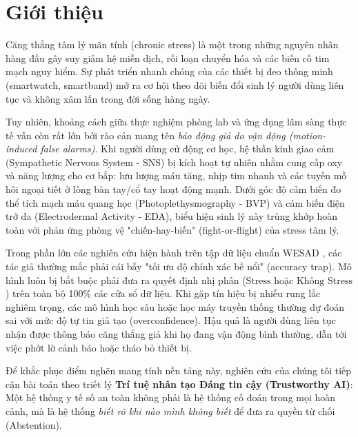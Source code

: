 \documentclass[conference]{IEEEtran}
\begin{document}
\section{Giới thiệu}
Căng thẳng tâm lý mãn tính (chronic stress) là một trong những nguyên nhân hàng đầu gây suy giảm hệ miễn dịch, rối loạn chuyển hóa và các biến cố tim mạch nguy hiểm. Sự phát triển nhanh chóng của các thiết bị đeo thông minh (smartwatch, smartband) mở ra cơ hội theo dõi biến đổi sinh lý người dùng liên tục và không xâm lấn trong đời sống hàng ngày.

Tuy nhiên, khoảng cách giữa thực nghiệm phòng lab và ứng dụng lâm sàng thực tế vẫn còn rất lớn bởi rào cản mang tên \textit{báo động giả do vận động (motion-induced false alarms)}. Khi người dùng cử động cơ học, hệ thần kinh giao cảm (Sympathetic Nervous System - SNS) bị kích hoạt tự nhiên nhằm cung cấp oxy và năng lượng cho cơ bắp: lưu lượng máu tăng, nhịp tim nhanh và các tuyến mồ hôi ngoại tiết ở lòng bàn tay/cổ tay hoạt động mạnh. Dưới góc độ cảm biến đo thể tích mạch máu quang học (Photoplethysmography - BVP) và cảm biến điện trở da (Electrodermal Activity - EDA), biểu hiện sinh lý này trùng khớp hoàn toàn với phản ứng phòng vệ "chiến-hay-biến" (fight-or-flight) của stress tâm lý. 

Trong phần lớn các nghiên cứu hiện hành trên tập dữ liệu chuẩn WESAD \cite{schmidt2018wesad, bobade2020stress}, các tác giả thường mắc phải cái bẫy "tối ưu độ chính xác bề nổi" (accuracy trap). Mô hình luôn bị bắt buộc phải đưa ra quyết định nhị phân ($\text{Stress}$ hoặc $\text{Không Stress}$) trên toàn bộ 100\% các cửa sổ dữ liệu. Khi gặp tín hiệu bị nhiễu rung lắc nghiêm trọng, các mô hình học sâu hoặc học máy truyền thống thường dự đoán sai với mức độ tự tin giả tạo (overconfidence). Hậu quả là người dùng liên tục nhận được thông báo căng thẳng giả khi họ đang vận động bình thường, dẫn tới việc phớt lờ cảnh báo hoặc tháo bỏ thiết bị.

Để khắc phục điểm nghẽn mang tính nền tảng này, nghiên cứu của chúng tôi tiếp cận bài toán theo triết lý \textbf{Trí tuệ nhân tạo Đáng tin cậy (Trustworthy AI)}: Một hệ thống y tế số an toàn không phải là hệ thống cố đoán trong mọi hoàn cảnh, mà là hệ thống \textit{biết rõ khi nào mình không biết} để đưa ra quyền từ chối (Abstention). 
\end{document}
